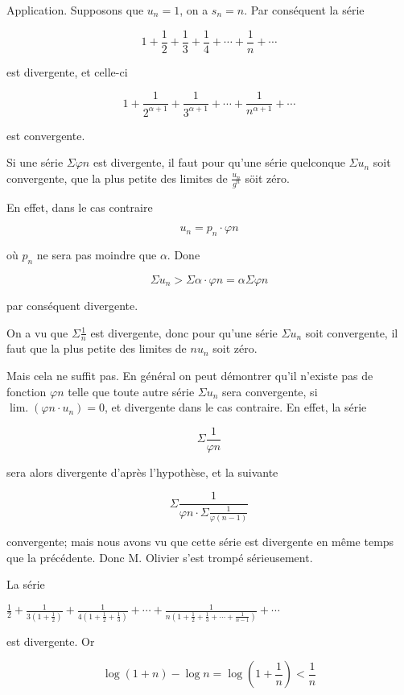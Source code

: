 \documentclass{article}
\begin{document}
Application. Supposons que \(u_{n}=1\), on a \(s_{n}=n\). Par conséquent la série

\[
1+\frac{1}{2}+\frac{1}{3}+\frac{1}{4}+\cdots+\frac{1}{n}+\cdots
\]

est divergente, et celle-ci

\[
1+\frac{1}{2^{\alpha+1}}+\frac{1}{3^{\alpha+1}}+\cdots+\frac{1}{n^{\alpha+1}}+\cdots
\]

est convergente.

Si une série \(\Sigma \varphi n\) est divergente, il faut pour qu'une série quelconque \(\Sigma u_{n}\) soit convergente, que la plus petite des limites de \(\frac{u_{n}}{g^{n}}\) söit zéro.

En effet, dans le cas contraire

\[
u_{n}=p_{n} \cdot \varphi n
\]

où \(p_{n}\) ne sera pas moindre que \(\alpha\). Done

\[
\Sigma u_{n}>\Sigma \alpha \cdot \varphi n=\alpha \Sigma \varphi n
\]

par conséquent divergente.

On a vu que \(\Sigma \frac{1}{n}\) est divergente, donc pour qu'une série \(\Sigma u_{n}\) soit convergente, il faut que la plus petite des limites de \(n u_{n}\) soit zéro.

Mais cela ne suffit pas. En général on peut démontrer qu'il n'existe pas de fonction \(\varphi n\) telle que toute autre série \(\Sigma u_{n}\) sera convergente, si \(\operatorname{lim.}\left(\varphi n \cdot u_{n}\right)=0\), et divergente dans le cas contraire. En effet, la série

\[
\Sigma \frac{1}{\varphi n}
\]

sera alors divergente d'après l'hypothèse, et la suivante

\[
\Sigma \frac{1}{\varphi n \cdot \Sigma \frac{1}{\varphi(n-1)}}
\]

convergente; mais nous avons vu que cette série est divergente en même temps que la précédente. Donc M. Olivier s'est trompé sérieusement.

La série

\(\frac{1}{2}+\frac{1}{3\left(1+\frac{1}{2}\right)}+\frac{1}{4\left(1+\frac{1}{2}+\frac{1}{3}\right)}+\cdots+\frac{1}{n\left(1+\frac{1}{2}+\frac{1}{3}+\cdots+\frac{1}{n-1}\right)}+\cdots\)

est divergente. Or

\[
\log (1+n)-\log n=\log \left(1+\frac{1}{n}\right)<\frac{1}{n}
\]
\end{document}

